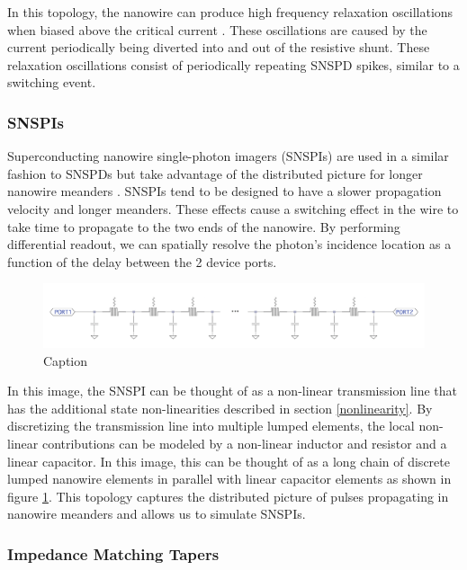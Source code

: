 \documentclass[]{article}
\newcommand{\todofig}[2][]{}
\begin{document}
In this topology, the nanowire can produce high frequency relaxation
oscillations when biased above the critical current \cite{relaxation_oscillations}.
These oscillations are caused by the
current periodically being diverted into and out of the resistive shunt. 
These relaxation oscillations consist of periodically repeating SNSPD spikes, 
similar to a switching event.

\subsubsection{SNSPIs} \label{snspi_intro}

Superconducting nanowire single-photon imagers (SNSPIs) are used in a similar fashion
to SNSPDs but take advantage of the distributed picture for longer nanowire meanders
 \cite{snspi_paper}.
SNSPIs tend to be designed to have a slower propagation velocity and longer meanders.
These effects cause a switching effect in the wire to take time to propagate to the two 
ends of the nanowire. By performing differential readout, we can spatially resolve
the photon's incidence location as a function of the delay between the 2 device ports.

\begin{figure}
    \centering
    \includegraphics[width=\textwidth]{figs/snspi_meander.png}
    \caption{Caption}
    \label{fig:snspi_tline}
\end{figure}
\todofig[]{SNSPI TLINE}

In this image, the SNSPI can be thought of as a non-linear transmission line that
has the additional state non-linearities described in section \ref{nonlinearity}. By discretizing the transmission line
into multiple lumped elements, the local non-linear contributions can be modeled by a
non-linear inductor and resistor and a linear capacitor. In this image,
this can be thought of as a long chain of discrete lumped nanowire elements in parallel
with linear capacitor elements as shown in figure \ref{fig:snspi_tline}. This topology captures the distributed picture of
pulses propagating in nanowire meanders and allows us to simulate SNSPIs.

\subsubsection{Impedance Matching Tapers} \label{tapers_intro}
\end{document}
